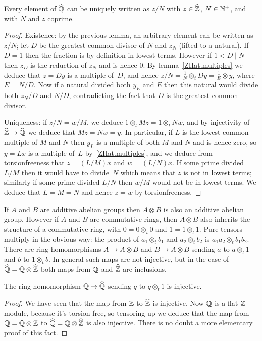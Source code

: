 \begin{lemma}
    \label{QHat.lowestTerms}
    \leanok
    Every element of $\widehat{\mathbb{Q}}$ can be uniquely written as $z/N$ with $z\in\widehat{\mathbb{Z}}$, $N\in\mathbb{N}^+$,
    and with $N$ and $z$ coprime.
\end{lemma}
\begin{proof}
    Existence: by the previous lemma, an arbitrary element can be written as $z/N$; let $D$
    be the greatest common divisor of $N$ and $z_N$ (lifted to a natural). If $D=1$
    then the fraction is by definition in lowest terms. However if $1<D\mid N$ then $z_D$
    is the reduction of $z_N$ and is hence 0. By lemma~\ref{ZHat.multiples} we deduce that $z=Dy$
    is a multiple of~$D$, and hence $z/N=\frac{1}{N}\otimes_tDy=\frac{1}{E}\otimes y$, where
    $E=N/D$. Now if a natural divided both $y_E$ and $E$ then this natural would divide both $z_N/D$
    and $N/D$, contradicting the fact that $D$ is the greatest common divisor.

    Uniqueness: if $z/N=w/M$, we deduce $1\otimes_t Mz=1\otimes_t Nw$,
    and by injectivity of $\widehat{\mathbb{Z}}\to\widehat{\mathbb{Q}}$ we deduce that $Mz=Nw=y$.
    In particular, if $L$ is the lowest common multiple of $M$ and $N$ then $y_L$ is a multiple of both $M$ and $N$ and is
    hence zero, so $y=Lx$ is a multiple of~$L$ by~\ref{ZHat.multiples}, and we deduce
    from torsionfreeness that $z=(L/M)x$ and $w=(L/N)x$. If some prime divided $L/M$
    then it would have to divide~$N$ which means that $z$ is not in lowest terms;
    similarly if some prime divided $L/N$ then $w/M$ would not be in lowest terms.
    We deduce that $L=M=N$ and hence $z=w$ by torsionfreeness.
\end{proof}

If $A$ and $B$ are additive abelian groups then $A\otimes B$ is also an additive abelian group.
However if $A$ and $B$ are commutative rings, then $A\otimes B$ also inherits the structure
of a commutative ring, with $0=0\otimes_t 0$ and $1=1\otimes_t 1$. Pure tensors multiply in the
obvious way: the product of $a_1\otimes_t b_1$ and $a_2\otimes_t b_2$ is $a_1a_2\otimes_t b_1b_2.$
There are ring homomorphisms $A\to A\otimes B$ and $B\to A\otimes B$ sending $a$ to $a\otimes_t 1$
and $b$ to $1\otimes_t b$. In general such maps are not injective, but in the case of
$\widehat{\mathbb{Q}}=\mathbb{Q}\otimes\widehat{\mathbb{Z}}$ both maps from $\mathbb{Q}$ and $\widehat{\mathbb{Z}}$ are inclusions.

\begin{lemma}
    \label{QHat.injective_rat}
    \leanok
    The ring homomorphism $\mathbb{Q}\to\widehat{\mathbb{Q}}$ sending $q$ to $q\otimes_t 1$
    is injective.
\end{lemma}
\begin{proof} We have seen that the map from $\mathbb{Z}$ to $\widehat{\mathbb{Z}}$ is
    injective. Now $\mathbb{Q}$ is a flat $\mathbb{Z}$-module, because it's
    torsion-free, so tensoring up we deduce that the map
    from $\mathbb{Q}=\mathbb{Q}\otimes\mathbb{Z}$ to $\widehat{\mathbb{Q}}=\mathbb{Q}\otimes\widehat{\mathbb{Z}}$ is also injective.
    There is no doubt a more elementary proof of this fact.
\end{proof}

